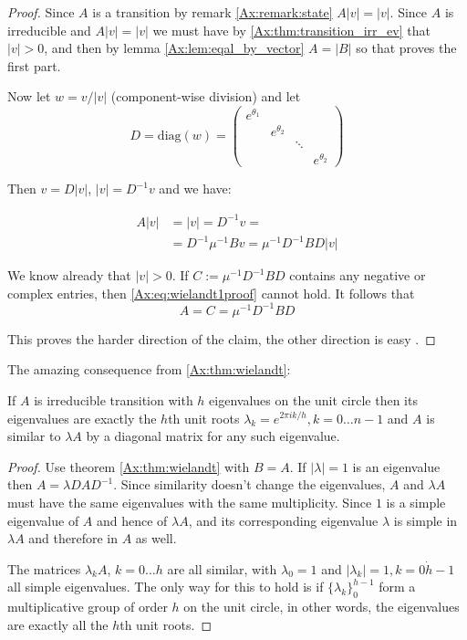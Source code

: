 \begin{thm}[Wielandt (1950)]
\begin{proof}
Since $A$ is a transition by remark \ref{Ax:remark:state} $A|v|=|v|$. Since $A$ is
irreducible and $A|v| = |v|$ we must have by \ref{Ax:thm:transition_irr_ev} that
$|v| \gt 0$, and then by
lemma \ref{Ax:lem:eqal_by_vector} $A = |B|$ so that proves the first part.  

Now let $w = v / |v|$ (component-wise division) and let 
\[D = \text{diag}(w) = 
\begin{pmatrix}
e^{\theta_1} & & & \\
& e^{\theta_2} & & \\
& & \ddots & \\
& & & e^{\theta_2}
\end{pmatrix}
\]

Then $v = D|v|$, $|v|=D^{-1}v$ and we have:

\begin{equation}
\label{Ax:eq:wielandt1proof}
\begin{aligned}
A|v| &= |v| = D^{-1}v = \\
&= D^{-1} \mu^{-1} B v = \mu^{-1} D^{-1} BD|v|
\end{aligned}
\end{equation}

We know already that $|v| \gt 0$. If 
$C := \mu^{-1} D^{-1} BD$ contains any negative or complex entries, then
\ref{Ax:eq:wielandt1proof} cannot hold. It follows that
\[
A = C = \mu^{-1} D^{-1} BD 
\]

This proves the harder direction of the claim, the other direction is easy \qedsymbol.

\end{proof}
\end{thm}

The amazing consequence from \ref{Ax:thm:wielandt}:

\begin{thm}[Corollarly]
\label{Ax:thm:wielandt2}
If $A$ is irreducible transition with $h$ 
eigenvalues on the unit circle then its eigenvalues are exactly the $h$th unit roots
$\lambda_k = e^{2 \pi i k /h}, k = 0 \dots n-1$ and $A$ is similar to $\lambda
A$ by a diagonal matrix for any such eigenvalue.

\begin{proof}
Use theorem \ref{Ax:thm:wielandt} with $B=A$. If $|\lambda|=1$ is an eigenvalue
then $A = \lambda D A D^{-1}$. Since similarity doesn't change the eigenvalues,
$A$ and $\lambda A$ must have the same eigenvalues with the same multiplicity.
Since $1$ is a simple eigenvalue of $A$ and hence of $\lambda A$, and its
corresponding eigenvalue $\lambda$ is simple in $\lambda A$ and therefore in $A$
as well.

The matrices $\lambda_k A$, $k=0 \dots h$ are all similar, with $\lambda_0 = 1$
and $|\lambda_k| = 1, k=0 \dot h-1$ all simple eigenvalues. The only way for this to hold is if
$\{\lambda_k\}_0^{h-1}$ form a multiplicative group of order $h$ on the unit
circle, in other words, the eigenvalues are exactly all the $h$th unit roots. 
\end{proof}
\end{thm}

